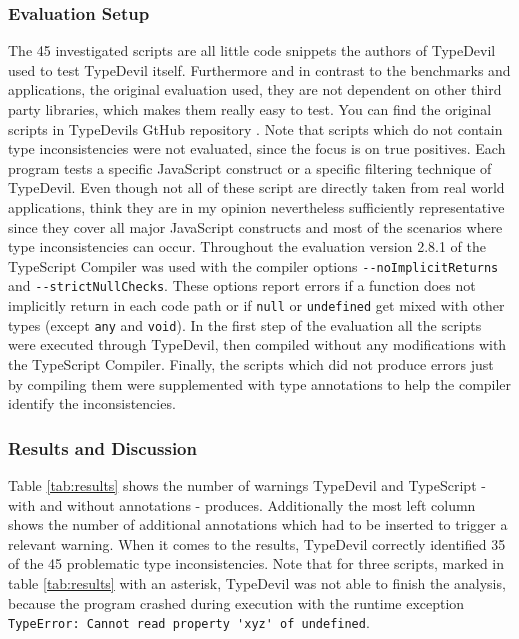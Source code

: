\documentclass[runningheads,a4paper]{llncs}
\begin{document}
\subsubsection{Evaluation Setup}
The 45 investigated scripts are all little code snippets the authors of TypeDevil used to test TypeDevil itself. 
Furthermore and in contrast to the benchmarks and applications, the original evaluation used, they are not dependent on other third party libraries, which makes them really easy to test.
You can find the original scripts in TypeDevils GtHub repository \cite{TypeDevilGitHubTests}.
Note that scripts which do not contain type inconsistencies were not evaluated, since the focus is on true positives.
Each program tests a specific JavaScript construct or a specific filtering technique of TypeDevil.
Even though not all of these script are directly taken from real world applications, think they are in my opinion nevertheless sufficiently representative since they cover all major JavaScript constructs and most of the scenarios where type inconsistencies can occur.
Throughout the evaluation version 2.8.1 of the TypeScript Compiler was used with the compiler options \lstinline[columns=fixed]{--noImplicitReturns} and \lstinline[columns=fixed]{--strictNullChecks}.
These options report errors if a function does not implicitly return in each code path or if \lstinline[columns=fixed]{null} or \lstinline[columns=fixed]{undefined} get mixed with other types (except \lstinline[columns=fixed]{any} and \lstinline[columns=fixed]{void}).
In the first step of the evaluation all the scripts were executed through TypeDevil, then compiled without any modifications with the TypeScript Compiler.
Finally, the scripts which did not produce errors just by compiling them were supplemented with type annotations to help the compiler identify the inconsistencies.


\subsubsection{Results and Discussion}
Table \ref{tab:results} shows the number of warnings TypeDevil and TypeScript - with and without annotations - produces.
Additionally the most left column shows the number of additional annotations which had to be inserted to trigger a relevant warning.
When it comes to the results, TypeDevil correctly identified 35 of the 45 problematic type inconsistencies.
Note that for three scripts, marked in table \ref{tab:results} with an asterisk, TypeDevil was not able to finish the analysis, because the program crashed during execution with the runtime exception \lstinline[columns=fixed]{TypeError: Cannot read property 'xyz' of undefined}.
\end{document}
